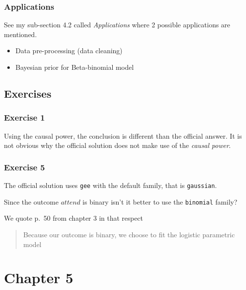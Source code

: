 \documentclass[
]{book}
\providecommand{\tightlist}{%
  \setlength{\itemsep}{0pt}\setlength{\parskip}{0pt}}
\theoremstyle{definition}
\theoremstyle{definition}
\theoremstyle{definition}
\theoremstyle{definition}
\theoremstyle{remark}
\begin{document}
\hypertarget{applications}{%
\subsubsection*{Applications}\label{applications}}

See my sub-section 4.2 called \emph{Applications} where 2 possible
applications are mentioned.

\begin{itemize}
\tightlist
\item
  Data pre-processing (data cleaning)
\item
  Bayesian prior for Beta-binomial model
\end{itemize}

\hypertarget{exercises}{%
\subsection*{Exercises}\label{exercises}}

\hypertarget{exercise-1}{%
\subsubsection*{Exercise 1}\label{exercise-1}}

Using the causal power, the conclusion is different than the official answer. It
is not obvious why the official solution does not make use of the \emph{causal power}.

\hypertarget{exercise-5}{%
\subsubsection*{Exercise 5}\label{exercise-5}}

The official solution uses \texttt{gee} with the default family, that is \texttt{gaussian}.

Since the outcome \(attend\) is binary isn't it better to use the \texttt{binomial}
family?

We quote p.~50 from chapter 3 in that respect

\begin{quote}
Because our outcome is binary, we choose to fit the logistic parametric
model
\end{quote}

\hypertarget{chapter-5}{%
\section*{Chapter 5}\label{chapter-5}}
\end{document}
